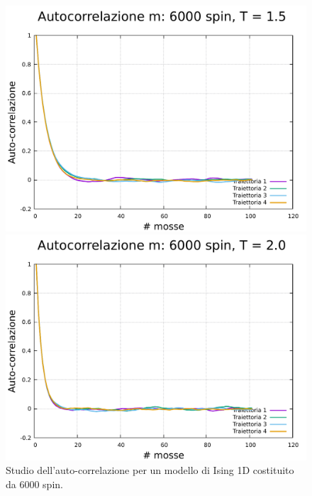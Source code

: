 \begin{figure}[htbp]
    \begin{minipage}{0.45\textwidth}  
      \centering
      \includegraphics[page=1, width=\textwidth]{Immagini/simIsing1D/magn0.0/tcorr/auto_6000_1.5.pdf}
      \caption{$T\,=\,1.5$}
    \end{minipage}\hfill
    \begin{minipage}{0.45\textwidth}  
      \centering
      \includegraphics[page=1, width=\textwidth]{Immagini/simIsing1D/magn0.0/tcorr/auto_6000_2.0.pdf}
      \caption{$T\,=\,2.0$}
    \end{minipage}
    \caption{Studio dell'auto-correlazione per un modello di Ising 1D costituito da 6000 spin.}
\end{figure}

